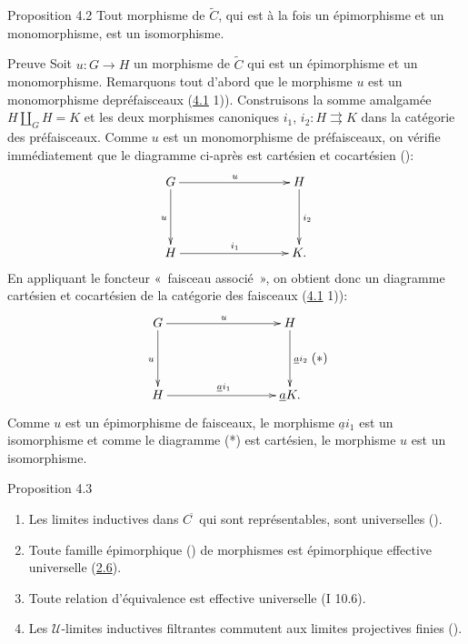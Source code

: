 \documentclass[10pt]{../fichiers-configuration-latex/smfart}
\begin{document}
\begin{enonce*}{Proposition 4.2}
Tout morphisme de $\widetilde{C}$, qui est à la fois un
épimorphisme et un monomorphisme, est un isomorphisme.
\end{enonce*}

\begin{enonce*}[remark]{Preuve}
Soit $u:G\rightarrow H$ un morphisme de $\widetilde{C}$ qui est un
épimorphisme et un monomorphisme. Remarquons tout d'abord que le
morphisme $u$ est un monomorphisme de\pageoriginale préfaisceaux
(\hyperref[II.theo4.1]{4.1} 1)). Construisons la somme amalgamée $H\amalg_G
H=K$ et les deux morphismes canoniques $i_1$,
$i_2:H\rightrightarrows K$ dans la catégorie des préfaisceaux.
Comme $u$ est un monomorphisme de préfaisceaux, on vérifie
immédiatement que le diagramme ci-après est cartésien et
cocartésien ():
\[
\xymatrix@C=3cm@R=1.5cm{
G \ar[r]^{u} \ar[d]_{u}& H \ar[d]^{i_2}\\
H \ar[r]^{i_1}& K . }
\]
En appliquant le foncteur « faisceau associé », on obtient
donc un diagramme cartésien et cocartésien de la catégorie des
faisceaux (\hyperref[II.theo4.1]{4.1} 1)):
\[\vcenter{
\xymatrix@C=3cm@R=1.5cm{
G \ar[r]^{u} \ar[d]_{u}& H \ar[d]^{\underline{a}i_2}\\
H \ar[r]^{\underline{a}i_1}& \underline{a}K . }}\leqno{(*)}
\]
Comme $u$ est un épimorphisme de faisceaux, le morphisme
$\underline{a}i_1$ est un isomorphisme et comme le diagramme (*) est
cartésien, le morphisme $u$ est un isomorphisme.
\end{enonce*}

\begin{enonce*}{Proposition 4.3}
\begin{enumerate}
\renewcommand{\labelenumi}{\theenumi)}
\item Les limites inductives dans $C^{\widetilde{\phantom{,}}}$ qui
  sont représentables, sont universelles {\rm ().}

\item Toute famille épimorphique {\rm()} de morphismes est
  épimorphique effective universelle (\hyperref[II.prop2.6]{2.6}).

\item Toute relation d'équivalence est effective universelle {\rm(I
  10.6).}

\item Les $𝒰$-limites inductives filtrantes commutent aux
  limites projectives finies {\rm ()}.
\end{enumerate}
\end{enonce*}
\end{document}
